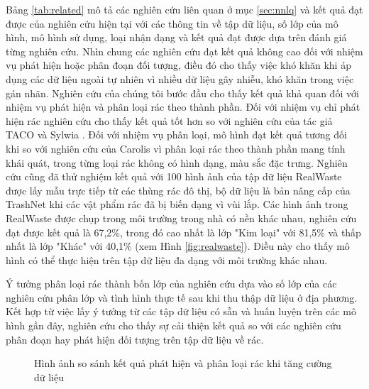 \documentclass[../the.tex]{subfiles}
\begin{document}
{\fontsize{13}{12} \selectfont

Bảng \ref{tab:related}
mô tả các nghiên cứu liên quan ở mục \ref{sec:nnlq} và kết quả đạt được của nghiên cứu hiện tại với các thông tin về tập dữ liệu, số lớp của mô hình, mô hình sử dụng, loại nhận dạng và kết quả đạt được dựa trên đánh giá từng nghiên cứu.
Nhìn chung các nghiên cứu đạt kết quả không cao đối với nhiệm vụ phát hiện hoặc phân đoạn đối tượng, điều đó cho thấy việc khó khăn khi áp dụng các dữ liệu ngoài tự nhiên vì nhiều dữ liệu gây nhiễu, khó khăn trong việc gán nhãn.
Nghiên cứu của chúng tôi bước đầu cho thấy kết quả khả quan đối với nhiệm vụ phát hiện và phân loại rác theo thành phần. Đối với nhiệm vụ chỉ phát hiện rác nghiên cứu cho thấy kết quả tốt hơn so với nghiên cứu của tác giả TACO \cite{proença2020taco} và Sylwia \cite{Majchrowska_2022}.
Đối với nhiệm vụ phân loại, mô hình đạt kết quả tương đối khi so với nghiên cứu của Carolis \cite{9122693} vì phân loại rác theo thành phần mang tính khái quát, trong từng loại rác không có hình dạng, màu sắc đặc trưng.
Nghiên cứu cũng đã thử nghiệm kết quả với 100 hình ảnh của tập dữ liệu RealWaste \cite{info14120633} được lấy mẫu trực tiếp từ các thùng rác đô thị, bộ dữ liệu là bản nâng cấp của TrashNet khi các vật phẩm rác đã bị biến dạng vì vùi lắp. 
Các hình ảnh trong RealWaste được chụp trong môi trường trong nhà có nền khác nhau, nghiên cứu đạt được kết quả là 67,2\%, trong đó cao nhất là lớp "Kim loại" với 81,5\% và thấp nhất là lớp "Khác" với 40,1\% (xem Hình \ref{fig:realwaste}).
Điều này cho thấy mô hình có thể thực hiện trên tập dữ liệu đa dạng với môi trường khác nhau.

}

\bigskip

{\fontsize{13}{12} \selectfont
Ý tưởng phân loại rác thành bốn lớp của nghiên cứu dựa vào số lớp của các nghiên cứu phân lớp và tình hình thực tế sau khi thu thập dữ liệu ở địa phương. Kết hợp từ việc lấy ý tưởng từ các tập dữ liệu có sẵn và huấn luyện trên các mô hình gần đây,
nghiên cứu cho thấy sự cải thiện kết quả so với các nghiên cứu phân đoạn hay phát hiện đối tượng trên tập dữ liệu về rác.

}

\begin{figure}[H]
    \centering
    \qquad
    \qquad
    \caption{Hình ảnh so sánh kết quả phát hiện và phân loại rác khi tăng cường dữ liệu}
    \label{fig:final}
\end{figure}
\end{document}
